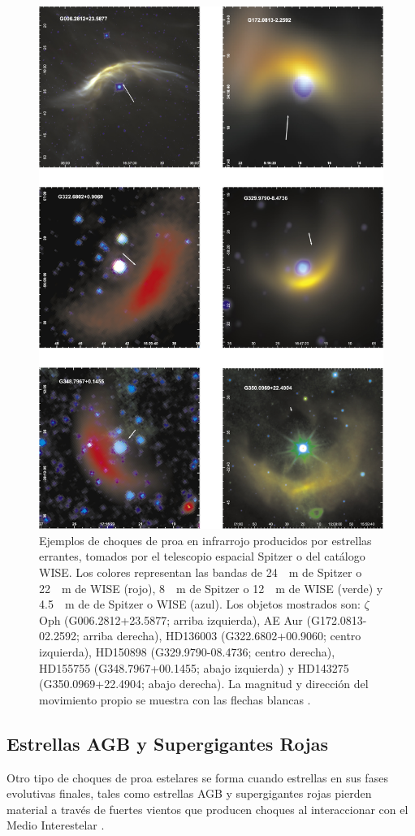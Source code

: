 \begin{figure}
  \centering
  \includegraphics[width=0.7\linewidth]{./Figures/kobulnicky}
  \caption{Ejemplos de choques de proa en infrarrojo producidos por estrellas errantes, tomados por el telescopio espacial Spitzer o del catálogo WISE. Los colores representan las bandas de \SI{24}{\mu.m} de Spitzer o \SI{22}{\mu.m} de WISE (rojo), \SI{8}{\mu.m} de Spitzer o \SI{12}{\mu.m} de WISE (verde) y \SI{4.5}{\mu.m} de de Spitzer o WISE (azul). Los objetos mostrados son: $\zeta$\, Oph (G006.2812+23.5877; arriba izquierda), AE Aur (G172.0813-02.2592; arriba derecha), HD136003 (G322.6802+00.9060; centro izquierda), HD150898 (G329.9790-08.4736; centro derecha), HD155755 (G348.7967+00.1455; abajo izquierda) y HD143275 (G350.0969+22.4904; abajo derecha). La magnitud y dirección del movimiento propio se muestra con las flechas blancas \citep{Kobulnicky:2016}.}
  \label{fig:runaway}
\end{figure}

\subsection{Estrellas AGB y Supergigantes Rojas}

Otro tipo de choques de proa estelares se forma cuando estrellas en sus fases evolutivas finales, tales como estrellas AGB y supergigantes rojas pierden material a través de fuertes vientos que producen choques al interaccionar con el Medio Interestelar \citep{Cox:2012}.


